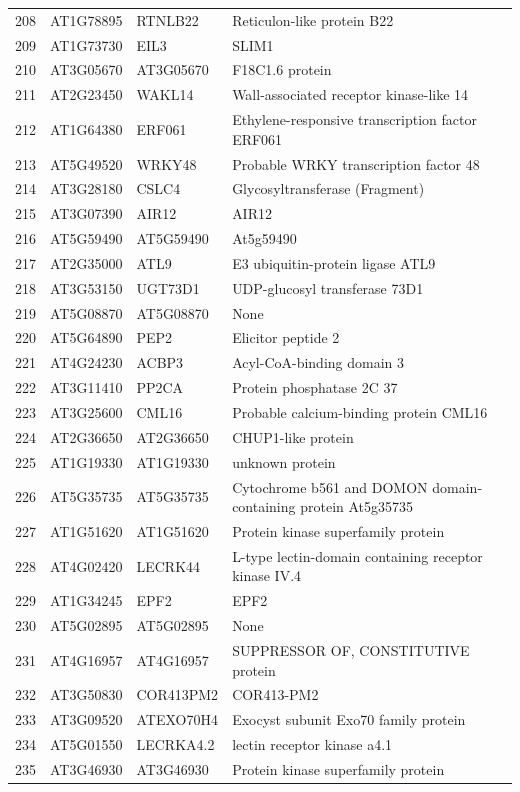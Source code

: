 \documentclass[11pt]{article}
\begin{document}
\begin{center}
\begin{tabular}{rlll}
208 & AT1G78895 & RTNLB22 & Reticulon-like protein B22\\
209 & AT1G73730 & EIL3 & SLIM1\\
210 & AT3G05670 & AT3G05670 & F18C1.6 protein\\
211 & AT2G23450 & WAKL14 & Wall-associated receptor kinase-like 14\\
212 & AT1G64380 & ERF061 & Ethylene-responsive transcription factor ERF061\\
213 & AT5G49520 & WRKY48 & Probable WRKY transcription factor 48\\
214 & AT3G28180 & CSLC4 & Glycosyltransferase (Fragment)\\
215 & AT3G07390 & AIR12 & AIR12\\
216 & AT5G59490 & AT5G59490 & At5g59490\\
217 & AT2G35000 & ATL9 & E3 ubiquitin-protein ligase ATL9\\
218 & AT3G53150 & UGT73D1 & UDP-glucosyl transferase 73D1\\
219 & AT5G08870 & AT5G08870 & None\\
220 & AT5G64890 & PEP2 & Elicitor peptide 2\\
221 & AT4G24230 & ACBP3 & Acyl-CoA-binding domain 3\\
222 & AT3G11410 & PP2CA & Protein phosphatase 2C 37\\
223 & AT3G25600 & CML16 & Probable calcium-binding protein CML16\\
224 & AT2G36650 & AT2G36650 & CHUP1-like protein\\
225 & AT1G19330 & AT1G19330 & unknown protein\\
226 & AT5G35735 & AT5G35735 & Cytochrome b561 and DOMON domain-containing protein At5g35735\\
227 & AT1G51620 & AT1G51620 & Protein kinase superfamily protein\\
228 & AT4G02420 & LECRK44 & L-type lectin-domain containing receptor kinase IV.4\\
229 & AT1G34245 & EPF2 & EPF2\\
230 & AT5G02895 & AT5G02895 & None\\
231 & AT4G16957 & AT4G16957 & SUPPRESSOR OF, CONSTITUTIVE protein\\
232 & AT3G50830 & COR413PM2 & COR413-PM2\\
233 & AT3G09520 & ATEXO70H4 & Exocyst subunit Exo70 family protein\\
234 & AT5G01550 & LECRKA4.2 & lectin receptor kinase a4.1\\
235 & AT3G46930 & AT3G46930 & Protein kinase superfamily protein\\

\end{tabular}
\end{center}
\end{document}

